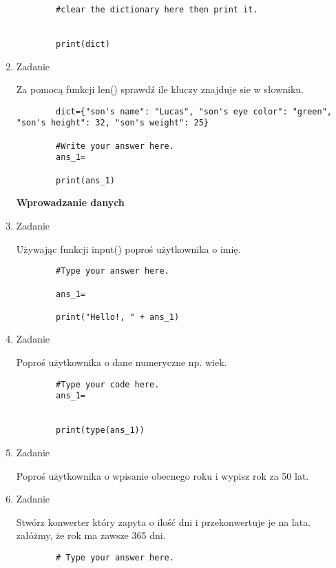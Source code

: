 \documentclass[11pt]{article}
\begin{document}
\begin{enumerate}
\begin{lstlisting}
		#clear the dictionary here then print it.
		
		
		print(dict)
	\end{lstlisting}
	
	\item 
	\begin{Large}
		Zadanie
	\end{Large}
	\par
	 Za pomocą funkcji len() sprawdź ile kluczy znajduje sie w słowniku.
	 \begin{lstlisting}
	 	dict={"son's name": "Lucas", "son's eye color": "green", "son's height": 32, "son's weight": 25}
	 	
	 	#Write your answer here.
	 	ans_1=
	 	
	 	print(ans_1)
	 \end{lstlisting}
 
 \medskip
 \begin{Large}
 	\textbf{Wprowadzanie danych}
 \end{Large}
	\item 
	\begin{Large}
		Zadanie
	\end{Large}
	\par
	Używając funkcji input() poproś użytkownika o imię.
	
	\begin{lstlisting}
		#Type your answer here.
		
		ans_1=
		
		print("Hello!, " + ans_1)
	\end{lstlisting}

	\item 
	\begin{Large}
		Zadanie
	\end{Large}
	\par
	Poproś użytkownika o dane numeryczne np. wiek.
	\begin{lstlisting}
		#Type your code here.
		ans_1=
		
		
		print(type(ans_1))
	\end{lstlisting}
	
	\item 
	\begin{Large}
		Zadanie
	\end{Large}
	\par
	Poproś użytkownika o wpisanie obecnego roku i wypisz rok za 50 lat.
	
	\item 
	\begin{Large}
		Zadanie
	\end{Large}
	\par
	Stwórz konwerter który zapyta o ilość dni i przekonwertuje je na lata.
	\\ załóżmy, że rok ma zawsze 365 dni.
	\begin{lstlisting}
		# Type your answer here.
		

\end{lstlisting}
\end{enumerate}
\end{document}

